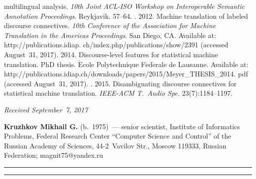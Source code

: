 \begin{multicols}{2}
{{\begin{thebibliography}{99}
multilingual analysis. \textit{10th Joint ACL-ISO Workshop on Interoperable 
Semantic Annotation Proceedings}. Reykjavik.  57--64.
  . 2012. 
Machine translation of labeled discourse connectives. \textit{10th Conference of the 
Association for Machine Translation in the Americas Proceedings}. San 
Diego, CA. Available at:  
{\sf http://publications.idiap. ch/index.php/publications/show/2391} (accessed August~31, 
2017).
   2014. Discourse-level features for statistical machine 
translation. PhD thesis. $\acute{\mbox{E}}$cole Polytechnique 
F$\acute{\mbox{e}}$d$\acute{\mbox{e}}$rale de Lausanne. Available at: {\sf 
http://publications.\linebreak idiap.ch/downloads/papers/2015/Meyer\_THESIS\_2014. pdf} (accessed 
August~31, 2017).
  . 2015. Disambiguating 
discourse connectives for statistical machine translation. \textit{IEEE-ACM 
T.~Audio Spe.} 23(7):1184--1197.
  \end{thebibliography} }
 }

\end{multicols}

\vspace*{-6pt}

\hfill{\small\textit{Received September~7, 2017}}

\vspace*{-14pt}
  
  \Contrl
  
  \noindent
\textbf{Kruzhkov Mikhail G.} (b.\ 1975)~--- senior scientist, Institute of 
Informatics Problems, Federal Research Center ``Computer Science and Control'' 
of the Russian Academy of Sciences, 44-2~Vavilov Str., Moscow 119333, Russian 
Federation; \mbox{magnit75@yandex.ru}

\vspace*{7pt}

\hrule

\vspace*{2pt}

\hrule


\vspace*{-4pt}



\def\tit{ПОДХОДЫ К АННОТАЦИИ ДИСКУРСИВНЫХ ОТНОШЕНИЙ В~ЛИНГВИСТИЧЕСКИХ КОРПУСАХ$^*$}

\def\aut{М.\,Г.~Кружков}


